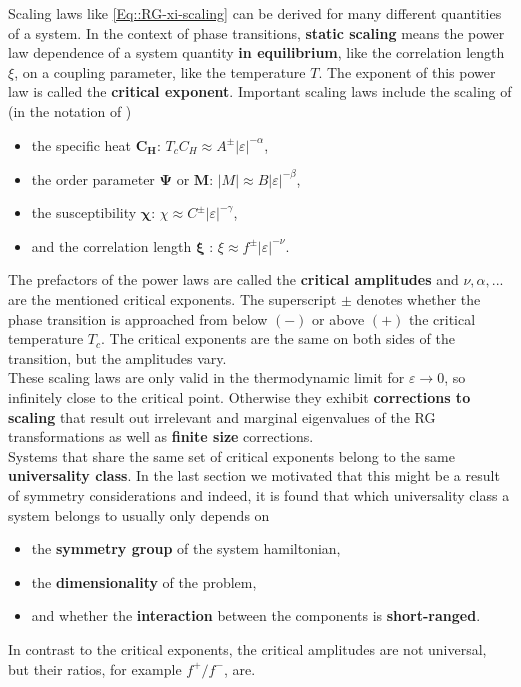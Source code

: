 	Scaling laws like \autoref{Eq::RG-xi-scaling} can be derived for many different quantities of a system. In the context of phase transitions, \textbf{static scaling} means the power law dependence of a system quantity \textbf{in equilibrium}, like the correlation length $\xi$, on a coupling parameter, like the temperature $T$. The exponent of this power law is called the \textbf{critical exponent}. Important scaling laws include the scaling of (in the notation of \cite{pelissetto2002critical})
	\begin{itemize}
		\item the specific heat $\boldsymbol{C_H}$: $T_c C_H \approx A^{\pm} |\varepsilon|^{-\alpha}$,
		\item the order parameter $\boldsymbol{\Psi}$ or $\boldsymbol{M}$: $|M| \approx B |\varepsilon|^{-\beta}$,
		\item the susceptibility $\boldsymbol{\chi}$: $\chi \approx C^{\pm} |\varepsilon|^{-\gamma}$,
		\item and the correlation length $\boldsymbol{\xi}$ : $\xi \approx f^{\pm} |\varepsilon|^{-\nu}$.		
	\end{itemize}
	The prefactors of the power laws are called the \textbf{critical amplitudes} and $\nu, \alpha, ...$ are the mentioned critical exponents. The superscript $\pm$ denotes whether the phase transition is approached from below $(-)$ or above $(+)$ the critical temperature $T_c$. The critical exponents are the same on both sides of the transition, but the amplitudes vary. \\
	
	These scaling laws are only valid in the thermodynamic limit for $\varepsilon \rightarrow 0$, so infinitely close to the critical point. Otherwise they exhibit \textbf{corrections to scaling} that result out irrelevant and marginal eigenvalues of the RG transformations as well as \textbf{finite size} corrections. \\
	
	Systems that share the same set of critical exponents belong to the same \textbf{universality class}. In the last section we motivated that this might be a result of symmetry considerations and indeed, it is found that which universality class a system belongs to usually only depends on
	\begin{itemize}
		\item the \textbf{symmetry group} of the system hamiltonian,
		\item the \textbf{dimensionality} of the problem,
		\item and whether the \textbf{interaction} between the components is \textbf{short-ranged}.
	\end{itemize}
	In contrast to the critical exponents, the critical amplitudes are not universal, but their ratios, for example $f^+/f^-$, are.\\
	

